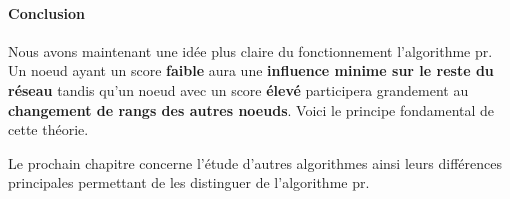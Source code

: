 \documentclass[12pt,twoside, openright]{memoir}
\begin{document}
	\paragraph*{Conclusion}
	Nous avons maintenant une idée plus claire du fonctionnement l'algorithme \gls{pr}. Un noeud ayant un score \textbf{faible} aura une \textbf{influence minime sur le reste du réseau} tandis qu'un noeud avec un score \textbf{élevé} participera grandement au \textbf{changement de rangs des autres noeuds}. Voici le principe fondamental de cette théorie.\par
	Le prochain chapitre concerne l'étude d'autres algorithmes ainsi leurs différences principales permettant de les distinguer de l'algorithme \gls{pr}.
	
\end{document}

